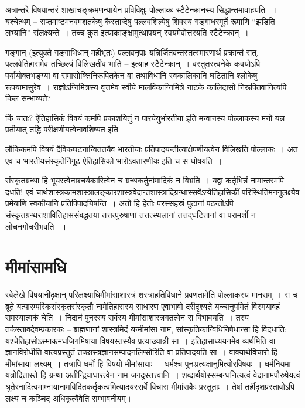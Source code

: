 अत्रान्तरे विषयान्तरं शाखाचङ्क्रमणन्यायेन प्रविविक्षुः पोल्लाकः स्टैटेन्क्रानस्य  सिद्धान्तमावाहयति ~। यश्चेत्थम् – सप्तमाष्टमनवमशतकेषु कैस्ताब्देषु पल्लवशिल्पेषु शिवस्य गङ्गाधरमूर्ते रूपाणि “झडिति लभ्यानि” संलक्ष्यन्ते~। तच्च कुत इत्याकाङ्क्षामुत्थापयन् स्वयमेवोत्तरयति स्टैटेन्क्रान्~।

गङ्गान् (इत्युक्ते गङ्गाभिधान् महीभृतः) पल्लवनृपाः यन्निर्जितवन्तस्तत्स्मारणार्थं प्रक्रान्तं सत्, पल्लवेतिहासमेव तच्छिल्पं विलिखतीव भाति – इत्याह स्टैटेन्क्रान्~। वस्तुतस्त्वनेके कवयोऽपि पर्यायोक्तभङ्ग्या वा समासोक्तिनिरूपितकेन वा तथाविधानि स्वकालिकानि घटितानि श्लोकेषु रूपयामासुरेव~। राज्ञोऽग्निमित्रस्य वृत्तमेव स्वीये मालविकाग्निमित्रे नाटके कालिदासो निरूपितवानित्यपि किल सम्भाव्यते?

किं चातः? ऐतिहासिकं विषयं कमपि प्रकाशयितुं न पारयेयुर्भारतीया इति मन्वानस्य पोल्लाकस्य मनो यन्न प्रतीयात् तद्धि परीक्षणीयत्वेनावशिष्यत इति~।

लौकिकमपि विषयं दैविकघटनान्विततयैव भारतीयाः प्रतिपादयन्तीत्याक्षेपणीयत्वेन विलिखति पोल्लाकः~। अत एव च भारतीयसंस्कृतेर्निगूढ ऐतिहासिको भारोऽवतारणीयः इति च स घोषयति~।

संस्कृतग्रन्था हि भूयस्त्वेनाश्चर्यकारित्वेन च ग्रन्थकर्तुर्नामादिकं न बिभ्रति~। यद्वा कर्तृभिन्नं नामान्तरमपि दधति! एवं चार्थशास्त्रकामशास्त्रालङ्कारशास्त्रवेदान्तशास्त्रादिग्रन्थास्सर्वेऽप्यैतिहासिकीं परिस्थितिमननुलक्ष्यैव प्रमेयाणि स्वकीयानि प्रतिपिपादयिषन्ति~। अतो हि हेतोः परस्सहस्रं पुटानां पठन्तोऽपि संस्कृतग्रन्थराशावितिहाससंबद्धतया तत्तत्पुरुषाणां तत्तत्स्थलानां तत्तद्घटितानां वा परामर्शो न लोचनगोचरीभवति ~।


\section*{मीमांसामधि}

स्वेलेखे विषयानीदृक्षान् परिलक्ष्याधिमीमांसाशास्त्रं शस्त्राहतिविधाने प्रवणतामेति पोल्लाकस्य मानसम्~। स च ब्रूते यत्पारम्परिकसंस्कृतसंस्कृतौ नामेतिहासस्य साधारण एवाभावो दरीदृश्यते यच्चानुपमितं विस्मयावहं समस्यात्मकं चेति~। निदानं पुनरस्य सर्वस्य मीमांसाशास्त्रगतत्वेन स विभावयति~। तस्य तर्कस्तावदेवम्प्रकारकः – ब्राह्मणानां शास्त्रमिदं यन्मीमांसा नाम, सांस्कृतिकान्विधिनिषेधान्सा हि विदधाति; यश्चेतिहासोऽस्माकमधजिगमिषाया विषयस्तस्यैव प्रत्याख्यात्री सा~। इतिहासाध्ययनमेव व्यर्थमिति वा ज्ञानविरोधीति वात्यप्रस्तुतं तच्छास्त्रज्ञानसम्पादनलिप्सोरिति वा प्रतिपादयति सा~। वाक्यार्थविचारो हि मीमांसाया लक्ष्यम्~। तत्रापि धर्मो हि विषयो मीमांसायाः~। धर्मश्च पुनःप्रत्यक्षानुमित्योरविषयः~। धर्मनियमा यत्रोदितास्ते हि ग्रन्था अतीन्द्रियाधारत्वेन नाम जगदुस्तत्त्वानि~। शब्दार्थयोस्सम्बन्धनित्यत्वं वेदानामपौरुषेयत्वं श्रुतेरनादित्वमाम्नायानामविदितकर्तृकत्वमित्यादयस्सर्वे विचारा मीमांसकैः प्रस्तुताः~। तेषां तर्हीदृशप्रस्तावोऽपि लक्ष्यं च कञ्चिद् अधिकृत्यैवेति सम्भावनीयम्।

